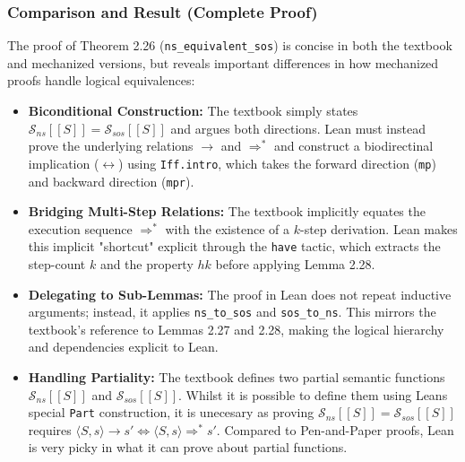 \subsubsection*{Comparison and Result (Complete Proof)}
The proof of Theorem 2.26 (\texttt{ns\_equivalent\_sos}) is concise in both the
textbook and mechanized versions, but reveals important differences in how
mechanized proofs handle logical equivalences:
\begin{itemize}
    \item \textbf{Biconditional Construction:}
    The textbook simply states $\mathcal{S}_{ns}[\![S]\!] = \mathcal{S}_{sos}[\![S]\!]$
    and argues both directions. Lean must instead prove the underlying relations \(\to\) and \(\Rightarrow^*\)
    and construct a biodirectinal implication
    ($\leftrightarrow$) using \texttt{Iff.intro}, which takes the forward
    direction (\texttt{mp}) and backward direction (\texttt{mpr}). 
    
    \item \textbf{Bridging Multi-Step Relations:}
    The textbook implicitly equates the execution sequence $\Rightarrow^*$
    with the existence of a $k$-step derivation. Lean makes this implicit
    "shortcut" explicit through the \texttt{have} tactic, which extracts
    the step-count $k$ and the property $hk$ before applying Lemma 2.28. 
    
    \item \textbf{Delegating to Sub-Lemmas:}
    The proof in Lean does not repeat inductive arguments; instead, it applies
    \texttt{ns\_to\_sos} and \texttt{sos\_to\_ns}. This mirrors the textbook's
    reference to Lemmas 2.27 and 2.28, making the logical hierarchy and
    dependencies explicit to Lean. 
    
    \item \textbf{Handling Partiality:}
    The textbook defines two partial semantic functions \(\mathcal{S}_{ns}[\![S]\!]\) and \(\mathcal{S}_{sos}[\![S]\!]\).
    Whilst it is possible to define them using Leans special \texttt{Part} construction,
    it is unecesary as proving $\mathcal{S}_{ns}[\![S]\!] = \mathcal{S}_{sos}[\![S]\!]$ requires
    \(\langle S, s \rangle \to s' \Leftrightarrow \langle S, s \rangle \Rightarrow^* s'\).
    Compared to Pen-and-Paper proofs, Lean is very picky in what it can prove about partial functions.
\end{itemize}

